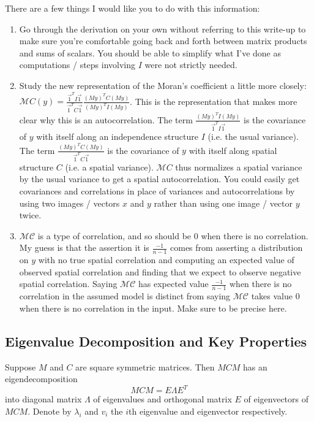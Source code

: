 \documentclass[12pt]{article}
\begin{document}
There are a few things I would like you to do with this information:
\begin{enumerate}
	\item Go through the derivation on your own without referring to this write-up to make sure you're comfortable going back and forth between matrix products and sums of scalars. You should be able to simplify what I've done as computations / steps involving $I$ were not strictly needed.
	\item Study the new representation of the Moran's coefficient a little more closely: $\mathcal MC(y)=\frac{\vec 1^T I\vec 1}{\vec 1^T C\vec 1}\frac{(My)^TC(My)}{(My)^TI(My)}$. This is the representation that makes more clear why this is an autocorrelation. The term $\frac{(My)^TI(My)}{\vec 1^T I\vec 1}$ is the covariance of $y$ with itself along an independence structure $I$ (i.e. the usual variance). The term $\frac{(My)^TC(My)}{\vec 1^T C\vec 1}$ is the covariance of $y$ with itself along spatial structure $C$ (i.e. a spatial variance). $\mathcal MC$ thus normalizes a spatial variance by the usual variance to get a spatial autocorrelation. You could easily get covariances and correlations in place of variances and autocorrelations by using two images / vectors $x$ and $y$ rather than using one image / vector $y$ twice.
	\item $\mathcal{MC}$ is a type of correlation, and so should be 0 when there is no correlation. My guess is that the assertion it is $\frac{-1}{n-1}$ comes from asserting a distribution on $y$ with no true spatial correlation and computing an expected value of observed spatial correlation and finding that we expect to observe negative spatial correlation. Saying $\mathcal{MC}$ has expected value $\frac{-1}{n-1}$ when there is no correlation in the assumed model is distinct from saying $\mathcal{MC}$ takes value 0 when there is no correlation in the input. Make sure to be precise here.
\end{enumerate}




\subsection*{Eigenvalue Decomposition and Key Properties}

Suppose $M$ and $C$ are square symmetric matrices. Then $MCM$ has an eigendecomposition 
$$MCM=E\Lambda E^T$$
into diagonal matrix $\Lambda$ of eigenvalues and orthogonal matrix $E$ of eigenvectors of $MCM$. Denote by $\lambda_i$ and $v_i$ the $i$th eigenvalue and eigenvector respectively.
\end{document}
